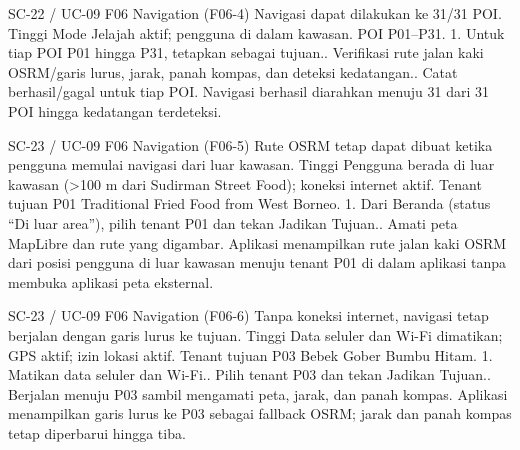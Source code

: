 \renewcommand{\tcactual}{Sesuai ekspektasi pada perangkat Android (Geometri 31 POI valid (\texttt{02-poi-dataset})). Navigasi berhasil diarahkan menuju 31 dari 31 POI hingga kedatangan terdeteksi.}
{SC-22 / UC-09}
{F06 Navigation}
{(F06-4) Navigasi dapat dilakukan ke 31/31 POI.}
{Tinggi}
{Mode Jelajah aktif; pengguna di dalam kawasan.}
{POI P01--P31.}
{1. Untuk tiap POI P01 hingga P31, tetapkan sebagai tujuan.. Verifikasi rute jalan kaki OSRM/garis lurus, jarak, panah kompas, dan deteksi kedatangan.. Catat berhasil/gagal untuk tiap POI.}
{Navigasi berhasil diarahkan menuju 31 dari 31 POI hingga kedatangan terdeteksi.}

\renewcommand{\tcactual}{Sesuai ekspektasi pada perangkat Android (Logika \texttt{fetchWalkingRoute} lolos (\texttt{routing.test})). Aplikasi menampilkan rute jalan kaki OSRM dari posisi pengguna di luar kawasan menuju tenant P01 di dalam aplikasi tanpa membuka aplikasi peta eksternal.}
{SC-23 / UC-09}
{F06 Navigation}
{(F06-5) Rute OSRM tetap dapat dibuat ketika pengguna memulai navigasi dari luar kawasan.}
{Tinggi}
{Pengguna berada di luar kawasan (>100 m dari Sudirman Street Food); koneksi internet aktif.}
{Tenant tujuan P01 Traditional Fried Food from West Borneo.}
{1. Dari Beranda (status ``Di luar area''), pilih tenant P01 dan tekan Jadikan Tujuan.. Amati peta MapLibre dan rute yang digambar.}
{Aplikasi menampilkan rute jalan kaki OSRM dari posisi pengguna di luar kawasan menuju tenant P01 di dalam aplikasi tanpa membuka aplikasi peta eksternal.}

\renewcommand{\tcactual}{Sesuai ekspektasi pada perangkat Android (Logika fallback rute lolos (\texttt{routing.test})). Aplikasi menampilkan garis lurus ke P03 sebagai fallback OSRM; jarak dan panah kompas tetap diperbarui hingga tiba.}
{SC-23 / UC-09}
{F06 Navigation}
{(F06-6) Tanpa koneksi internet, navigasi tetap berjalan dengan garis lurus ke tujuan.}
{Tinggi}
{Data seluler dan Wi-Fi dimatikan; GPS aktif; izin lokasi aktif.}
{Tenant tujuan P03 Bebek Gober Bumbu Hitam.}
{1. Matikan data seluler dan Wi-Fi.. Pilih tenant P03 dan tekan Jadikan Tujuan.. Berjalan menuju P03 sambil mengamati peta, jarak, dan panah kompas.}
{Aplikasi menampilkan garis lurus ke P03 sebagai fallback OSRM; jarak dan panah kompas tetap diperbarui hingga tiba.}

